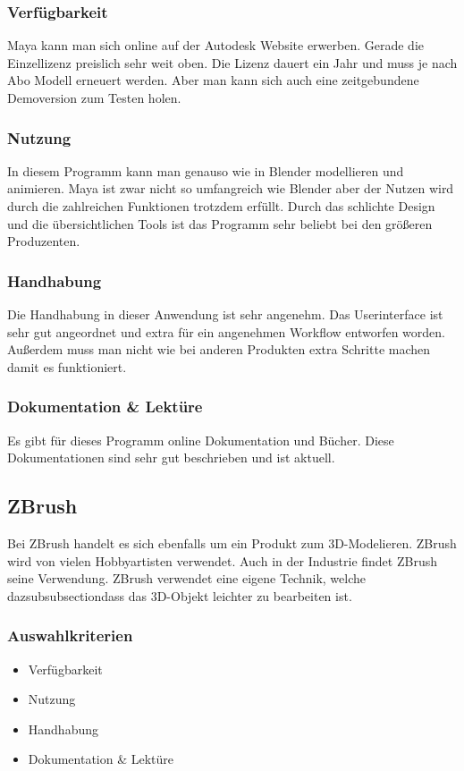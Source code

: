 \subsubsection{Verfügbarkeit}
Maya kann man sich online auf der Autodesk Website erwerben. Gerade die Einzellizenz preislich sehr weit oben. Die Lizenz dauert ein Jahr und muss je nach Abo Modell erneuert werden. Aber man kann sich auch eine zeitgebundene Demoversion zum Testen holen.

\subsubsection{Nutzung}
In diesem Programm kann man genauso wie in Blender modellieren und animieren. Maya ist zwar nicht so umfangreich wie Blender aber der Nutzen wird durch die zahlreichen Funktionen trotzdem erfüllt. Durch das schlichte Design und die übersichtlichen Tools ist das Programm sehr beliebt bei den größeren Produzenten.

\subsubsection{Handhabung}
Die Handhabung in dieser Anwendung ist sehr angenehm. Das Userinterface ist sehr gut angeordnet und extra für ein angenehmen Workflow entworfen worden. Außerdem muss man nicht wie bei anderen Produkten extra Schritte machen damit es funktioniert.

\subsubsection{Dokumentation \& Lektüre}
Es gibt für dieses Programm online Dokumentation und Bücher. Diese Dokumentationen sind sehr gut beschrieben und ist aktuell.

\pagebreak

\subsection{ZBrush}
Bei ZBrush handelt es sich ebenfalls um ein Produkt zum 3D-Modelieren. ZBrush wird von vielen Hobbyartisten verwendet. Auch in der Industrie findet ZBrush seine Verwendung. ZBrush verwendet eine eigene Technik, welche dazsubsubsectiondass das 3D-Objekt leichter zu bearbeiten ist.

\subsubsection{Auswahlkriterien}
\begin{itemize}
    \item Verfügbarkeit
    \item Nutzung
    \item Handhabung
    \item Dokumentation \& Lektüre
\end{itemize}

